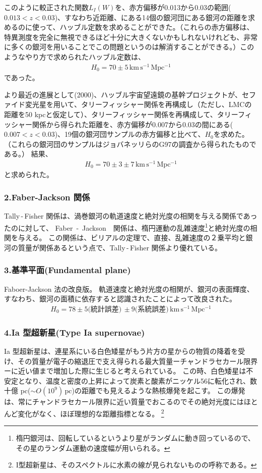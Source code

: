 \documentclass[11pt]{ltjsarticle}
\theoremstyle{plain}
\theoremstyle{break}
\begin{document}
このように較正された関数$L_I(W)$を、赤方偏移が0.013から0.03の範囲($0.013<z<0.03$)、すなわち近距離、にある14個の銀河団にある銀河の距離を求めるのに使って、ハッブル定数を求めることができた。（これらの赤方偏移は、特異測度を完全に無視できるほど十分に大きくないかもしれないけれども、非常に多くの銀河を用いることでこの問題というのは解消することができる。）このようなやり方で求められたハッブル定数は、
\begin{align}
 H_0 = 70 \pm5 \,\mathrm{km\,s^{-1}\,Mpc^{-1}}
\end{align}%
であった。

より最近の進展として(2000)、ハッブル宇宙望遠鏡の基幹プロジェクトが、セファイド変光星を用いて、タリーフィッシャー関係を再構成し（ただし、LMCの距離を50 kpcと仮定して）、タリーフィッシャー関係を再構成して、タリーフィッシャー関係から得られた距離を、赤方偏移が0.007から0.03の間にある($0.007<z<0.03$)、19個の銀河団サンプルの赤方偏移と比べて、$H_0$を求めた。
（これらの銀河団のサンプルはジョバネッリらのG97の調査から得られたものである。）
結果、
\begin{align}
 H_0 = 70 \pm3 \pm7 \,\mathrm{km\,s^{-1}\,Mpc^{-1}}
\end{align}%
と求められた。


\subsubsection*{2.Faber-Jackson 関係}
Tally\,-\,Fisher 関係は、渦巻銀河の軌道速度と絶対光度の相関を与える関係であったのに対して、
Faber \,-\, Jackson　関係は、楕円運動の乱雑速度\footnote{楕円銀河は、回転しているというより星がランダムに動き回っているので、 その星のランダム運動の速度幅が用いられる。}と絶対光度の相関を与える。
この関係は、ビリアルの定理で、直接、乱雑速度の２乗平均と銀河の質量が関係あるという点で、Tally\,-\,Fisher 関係より優れている。

\subsubsection*{3.基準平面(Fundamental plane)}
Faboer-Jackson 法の改良版。
軌道速度と絶対光度の相関が、銀河の表面輝度、すなわち、銀河の面積に依存すると認識されたことによって改良された。
\begin{align}
  H_0 = 78 \pm 5 \text{(統計誤差)} \, \pm 9 \text{(系統誤差)} \, \mathrm{km\,s^{-1}\,Mpc^{-1}}
\end{align}

\subsubsection*{4.Ia 型超新星(Type Ia supernovae)}
Ia 型超新星は、連星系にいる白色矮星がもう片方の星からの物質の降着を受け、その質量が電子の縮退圧で支え得られる最大質量ーチャンドラセカール限界ーに近い値まで増加した際に生じると考えられている。
この時、白色矮星は不安定となり、温度と密度の上昇によって炭素と酸素がニッケル56に転化され、数十億 pc($\sim  O(10^9) \, \mathrm{pc} $)の距離でも見えるような熱核爆発を起こす。
この爆発は、常にチャンドラセカール限界に近い質量でおこるのでその絶対光度にはほとんど変化がなく、ほぼ理想的な距離指標となる。
\footnote{
I型超新星は、そのスペクトルに水素の線が見られないものの呼称である。
}
\end{document}
